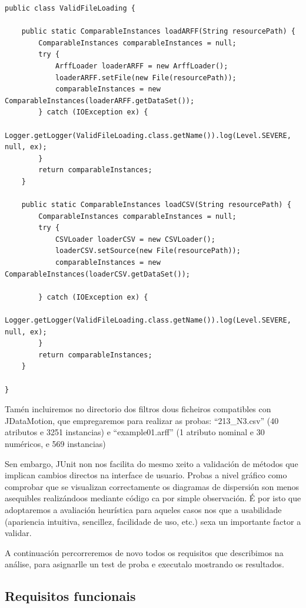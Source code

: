 \begin{lstlisting}
public class ValidFileLoading {

    public static ComparableInstances loadARFF(String resourcePath) {
        ComparableInstances comparableInstances = null;
        try {
            ArffLoader loaderARFF = new ArffLoader();
            loaderARFF.setFile(new File(resourcePath));
            comparableInstances = new ComparableInstances(loaderARFF.getDataSet());
        } catch (IOException ex) {
            Logger.getLogger(ValidFileLoading.class.getName()).log(Level.SEVERE, null, ex);
        }
        return comparableInstances;
    }

    public static ComparableInstances loadCSV(String resourcePath) {
        ComparableInstances comparableInstances = null;
        try {
            CSVLoader loaderCSV = new CSVLoader();
            loaderCSV.setSource(new File(resourcePath));
            comparableInstances = new ComparableInstances(loaderCSV.getDataSet());

        } catch (IOException ex) {
            Logger.getLogger(ValidFileLoading.class.getName()).log(Level.SEVERE, null, ex);
        }
        return comparableInstances;
    }

}
\end{lstlisting}

Tamén incluiremos no directorio dos filtros dous ficheiros compatibles con JDataMotion, que empregaremos para realizar as probas: ``213\_N3.csv'' (40 atributos e 3251 instancias) e ``example01.arff'' (1 atributo nominal e 30 numéricos, e 569 instancias)

Sen embargo, JUnit non nos facilita do mesmo xeito a validación de métodos que implican cambios directos na interface de usuario. Probas a nivel gráfico como comprobar que se visualizan correctamente os diagramas de dispersión son menos asequibles realizándoos mediante código ca por simple observación. É por isto que adoptaremos a avaliación heurística para aqueles casos nos que a usabilidade (apariencia intuitiva, sencillez, facilidade de uso, etc.) sexa un importante factor a validar.

A continuación percorreremos de novo todos os requisitos que describimos na análise, para asignarlle un test de proba e executalo mostrando os resultados.

\subsection{Requisitos funcionais}

